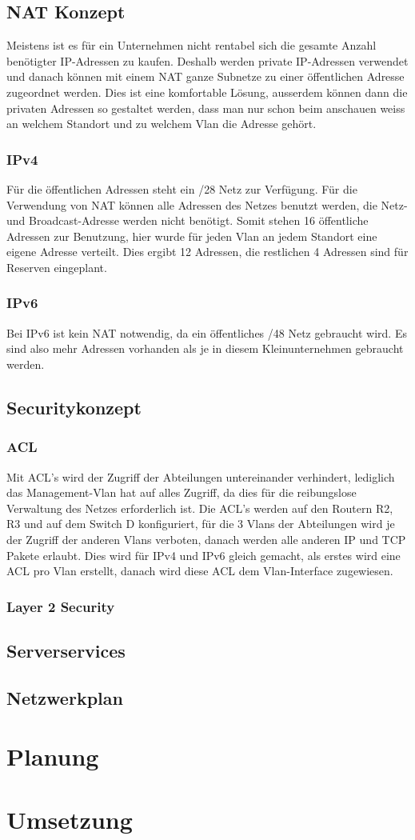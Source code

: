 \documentclass[12pt,a4paper,titlepage]{article}
\begin{document}
\subsection{NAT Konzept}
Meistens ist es für ein Unternehmen nicht rentabel sich die gesamte Anzahl benötigter IP-Adressen zu  kaufen. Deshalb werden private IP-Adressen verwendet und danach können mit einem NAT ganze Subnetze zu einer öffentlichen Adresse zugeordnet werden. Dies ist eine komfortable Lösung, ausserdem können dann die privaten Adressen so gestaltet werden, dass man nur schon beim anschauen weiss an welchem Standort und zu welchem Vlan die Adresse gehört.

\subsubsection{IPv4}
Für die öffentlichen Adressen steht ein /28 Netz zur Verfügung. Für die Verwendung von NAT können alle Adressen des Netzes benutzt werden, die Netz- und Broadcast-Adresse werden nicht benötigt. Somit stehen 16 öffentliche Adressen zur Benutzung, hier wurde für jeden Vlan an jedem Standort eine eigene Adresse verteilt. Dies ergibt 12 Adressen, die restlichen 4 Adressen sind für Reserven eingeplant.

\subsubsection{IPv6}
Bei IPv6 ist kein NAT notwendig, da ein öffentliches /48 Netz gebraucht wird. Es sind also mehr Adressen vorhanden als je in diesem Kleinunternehmen gebraucht werden.

\newpage
\subsection{Securitykonzept} 
\subsubsection{ACL}
Mit ACL's wird der Zugriff der Abteilungen untereinander verhindert, lediglich das Management-Vlan hat auf alles Zugriff, da dies für die reibungslose Verwaltung des Netzes erforderlich ist.
Die ACL's werden auf den Routern R2, R3 und auf dem Switch D konfiguriert, für die 3 Vlans der Abteilungen wird je der Zugriff der anderen Vlans verboten, danach werden alle anderen IP und TCP Pakete erlaubt. Dies wird für IPv4 und IPv6 gleich gemacht, als erstes wird eine ACL pro Vlan erstellt, danach wird diese ACL dem Vlan-Interface zugewiesen.

\subsubsection{Layer 2 Security}
\subsection{Serverservices}
\subsection{Netzwerkplan}
\section{Planung}
\section{Umsetzung}
\end{document}
